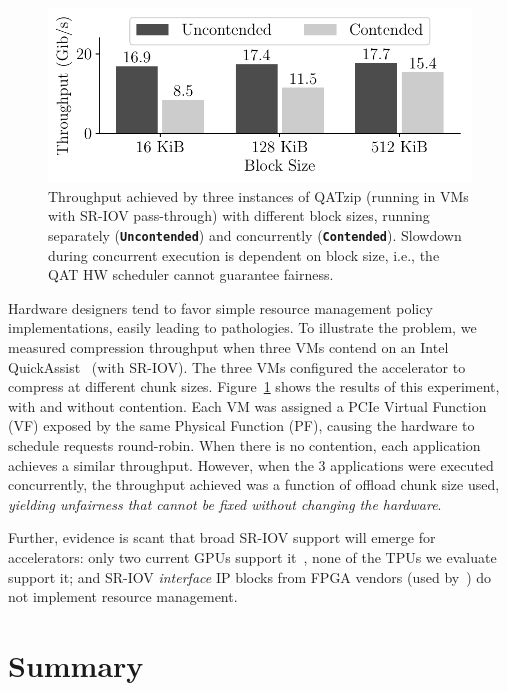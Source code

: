 \begin{figure}[!t]
	\centering
  \vspace{-0.5em}
	\includegraphics[width=.75\linewidth]{figures/qat_unfairness.pdf}
    \vspace{-.2cm}
	\caption{Throughput achieved by three instances of QATzip (running in VMs with SR-IOV pass-through) with different block sizes, running separately (\textbf{\texttt{Uncontended}}) and concurrently (\textbf{\texttt{Contended}}). Slowdown during concurrent execution is dependent on block size, i.e., the QAT HW scheduler cannot guarantee fairness.}
	\label{fig:qat-unfairness}
\end{figure}

Hardware designers tend to favor simple resource management policy
implementations, easily leading to pathologies. To illustrate the problem, we
measured compression throughput when three VMs contend on an Intel
QuickAssist~\cite{qat} (with SR-IOV). The three VMs configured the accelerator
to compress at different chunk sizes. Figure~\ref{fig:qat-unfairness} shows
the results of this experiment, with and without contention. Each VM was
assigned a PCIe Virtual Function (VF) exposed by the same Physical Function
(PF), causing the hardware to schedule requests round-robin. When there is no
contention, each application achieves a similar throughput. However, when the
3 applications were executed concurrently, the throughput achieved was a
function of offload chunk size used, \emph{yielding unfairness that cannot be
fixed without changing the hardware}.

Further, evidence is scant that broad SR-IOV support will emerge for
accelerators: only two current GPUs support it~\cite{amdfirepro,nvidiagrid},
none of the TPUs we evaluate support it; and SR-IOV \emph{interface} IP blocks
from FPGA vendors (used by~\cite{vu2014enabling,zazo2015pcie,vfpgamanager,
huang2009fpgavirt}) do not implement resource management.

\section{Summary}


